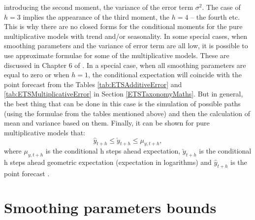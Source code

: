 \documentclass[
]{book}
\theoremstyle{definition}
\theoremstyle{definition}
\theoremstyle{definition}
\theoremstyle{definition}
\theoremstyle{remark}
\begin{document}
introducing the second moment, the variance of the error term \(\sigma^2\). The case of \(h=3\) implies the appearance of the third moment, the \(h=4\) -- the fourth etc. This is why there are no closed forms for the conditional moments for the pure multiplicative models with trend and/or seasonality. In some special cases, when smoothing parameters and the variance of error term are all low, it is possible to use approximate formulae for some of the multiplicative models. These are discussed in Chapter 6 of \citet{Hyndman2008b}. In a special case, when all smoothing parameters are equal to zero or when \(h=1\), the conditional expectation will coincide with the point forecast from the Tables \ref{tab:ETSAdditiveError} and \ref{tab:ETSMultiplicativeError} in Section \ref{ETSTaxonomyMaths}. But in general, the best thing that can be done in this case is the simulation of possible paths (using the formulae from the tables mentioned above) and then the calculation of mean and variance based on them. Finally, it can be shown for pure multiplicative models that:
\begin{equation}
    \hat{y}_{t+h} \leq \check{y}_{t+h} \leq \mu_{y,t+h} ,
    \label{eq:ETSADAMpointValueInequality}
\end{equation}
where \(\mu_{y,t+h}\) is the conditional h steps ahead expectation, \(\check{y}_{t+h}\) is the conditional h steps ahead geometric expectation (expectation in logarithms) and \(\hat{y}_{t+h}\) is the point forecast \citep{Svetunkov2020ETS}.

\hypertarget{stabilityConditionMultiplicativeError}{%
\section{Smoothing parameters bounds}\label{stabilityConditionMultiplicativeError}}
\end{document}
